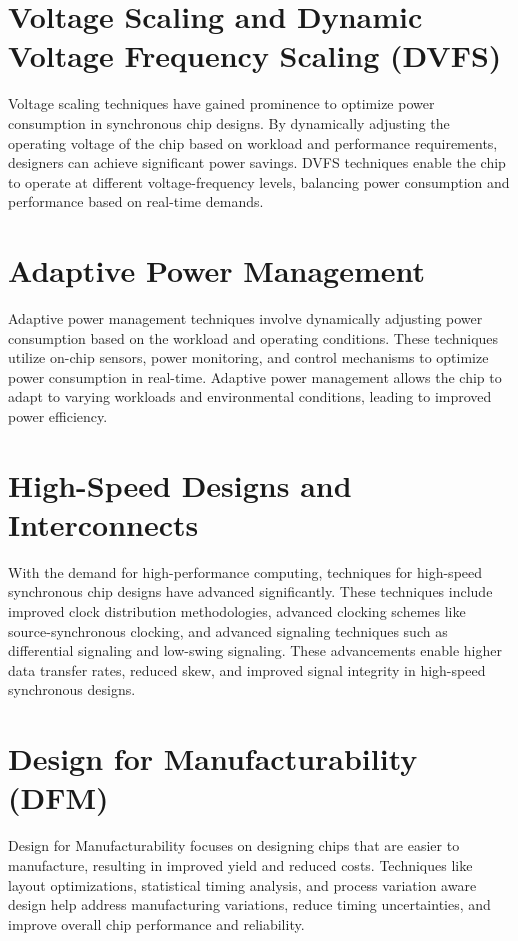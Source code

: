\documentclass[a4paper,11pt]{report}
\begin{document}
\section{Voltage Scaling and Dynamic Voltage Frequency Scaling (DVFS)}
Voltage scaling techniques have gained prominence to optimize power consumption in synchronous chip designs. By dynamically adjusting the operating voltage of the chip based on workload and performance requirements, designers can achieve significant power savings. DVFS techniques enable the chip to operate at different voltage-frequency levels, balancing power consumption and performance based on real-time demands.

\section{Adaptive Power Management}
Adaptive power management techniques involve dynamically adjusting power consumption based on the workload and operating conditions. These techniques utilize on-chip sensors, power monitoring, and control mechanisms to optimize power consumption in real-time. Adaptive power management allows the chip to adapt to varying workloads and environmental conditions, leading to improved power efficiency.

\section{High-Speed Designs and Interconnects}
With the demand for high-performance computing, techniques for high-speed synchronous chip designs have advanced significantly. These techniques include improved clock distribution methodologies, advanced clocking schemes like source-synchronous clocking, and advanced signaling techniques such as differential signaling and low-swing signaling. These advancements enable higher data transfer rates, reduced skew, and improved signal integrity in high-speed synchronous designs.

\section{Design for Manufacturability (DFM)}
Design for Manufacturability focuses on designing chips that are easier to manufacture, resulting in improved yield and reduced costs. Techniques like layout optimizations, statistical timing analysis, and process variation aware design help address manufacturing variations, reduce timing uncertainties, and improve overall chip performance and reliability.
\end{document}
